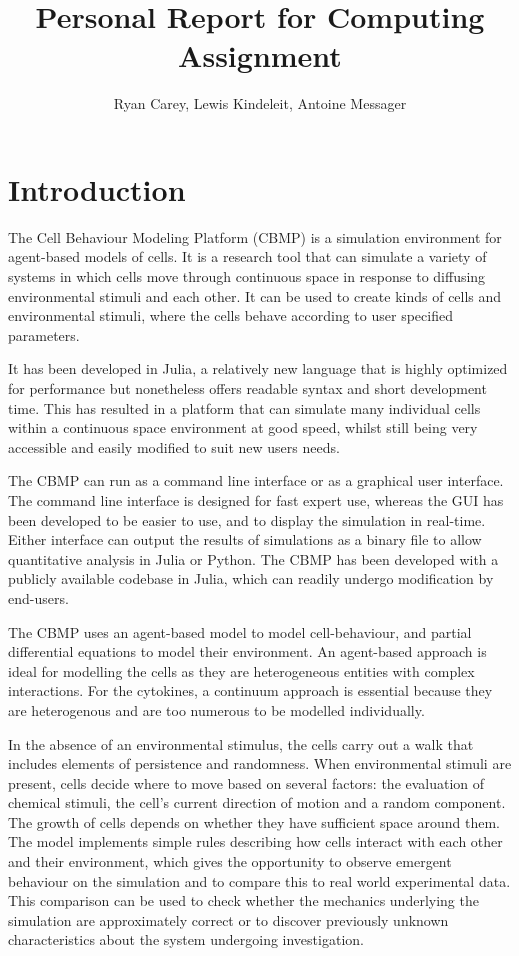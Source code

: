 \documentclass[12pt,a4paper]{report}
\title{Personal Report for Computing Assignment}
\author{Ryan Carey, Lewis Kindeleit, Antoine Messager}
\begin{document}
\section{Introduction}
The Cell Behaviour Modeling Platform (CBMP) is a simulation environment 
for agent-based models of cells. It is a research tool that can simulate 
a variety of systems in which cells move through continuous space in 
response to diffusing environmental stimuli and each other. It can be 
used to create kinds of cells and environmental stimuli, where the cells 
behave according to user specified parameters.

It has been developed in Julia, a relatively new language that is highly 
optimized for performance but nonetheless offers readable syntax and 
short development time. This has resulted in a platform that can 
simulate many individual cells within a continuous space environment at 
good speed, whilst still being very accessible and easily modified to 
suit new users needs.

The CBMP can run as a command line interface or as a graphical user 
interface. The command line interface is designed for fast expert use, 
whereas the GUI has been developed to be easier to use, and to display 
the simulation in real-time. Either interface can output the results of 
simulations as a binary file to allow quantitative analysis in Julia or 
Python. The CBMP has been developed with a publicly available codebase 
in Julia, which can readily undergo modification by end-users.

The CBMP uses an agent-based model to model cell-behaviour, and partial 
differential equations to model their environment. An agent-based 
approach is ideal for modelling the cells as they are heterogeneous 
entities with complex interactions. For the cytokines, a continuum 
approach is essential because they are heterogenous and are too numerous 
to be modelled individually.

In the absence of an environmental stimulus, the cells carry out a walk 
that includes elements of persistence and randomness. When environmental 
stimuli are present, cells decide where to move based on several 
factors: the evaluation of chemical stimuli, the cell's current 
direction of motion and a random component. The growth of cells depends 
on whether they have sufficient space around them. The model implements 
simple rules describing how cells interact with each other and their 
environment, which gives the opportunity to observe emergent behaviour 
on the simulation and to compare this to real world experimental data. 
This comparison can be used to check whether the mechanics underlying 
the simulation are approximately correct or to discover previously 
unknown characteristics about the system undergoing investigation.
\end{document}
